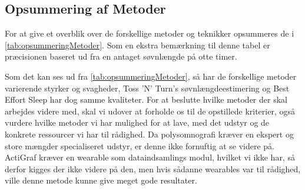 \subsection{Opsummering af Metoder}\label{subsec:summametoder}
For at give et overblik over de forskellige metoder og teknikker opsummeres de i \cref{tab:opsummeringMetoder}.
Som en ekstra bemærkning til denne tabel er præcisionen baseret ud fra en antaget søvnlængde på otte timer. 


\begin{table}[h]
\caption{Opsummering af de forskellige metoder til søvnestimering.}
\label{tab:opsummeringMetoder}
\end{table}

Som det kan ses ud fra \cref{tab:opsummeringMetoder}, så har de forskellige metoder varierende styrker og svagheder, Toss 'N' Turn's søvnlængdeestimering og Best Effort Sleep har dog samme kvaliteter.
For at beslutte hvilke metoder der skal arbejdes videre med, skal vi udover at forholde os til de opstillede kriterier, også vurdere hvilke metoder vi har mulighed for at lave, med det udstyr og de konkrete ressourcer vi har til rådighed.
Da polysomnografi kræver en ekspert og store mængder specialiseret udstyr, er denne ikke fornuftig at se videre på.
ActiGraf kræver en wearable som dataindsamlings modul, hvilket vi ikke har, så derfor kigges der ikke videre på den, men hvis sådanne wearables var til rådighed, ville denne metode kunne give meget gode resultater.

